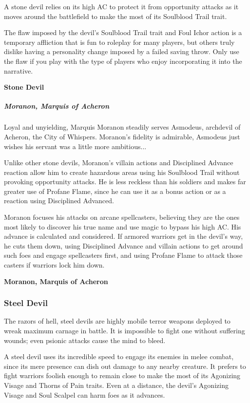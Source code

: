 \documentclass[10pt,a4paper,twoside,bg=print,twocolumn,openany,nodeprecatedcode]{dndbook}
\begin{document}
A stone devil relies on its high AC to protect it from opportunity attacks as it moves around the battlefield to make the most of its Soulblood Trail trait.

The flaw imposed by the devil's Soulblood Trail trait and Foul Ichor action is a temporary affliction that is fun to roleplay for many players, but others truly dislike having a personality change imposed by a failed saving throw. Only use the flaw if you play with the type of players who enjoy incorporating it into the narrative.

\textbf{Stone Devil}

\subparagraph{Moranon, Marquis of Acheron}
Loyal and unyielding, Marquis Moranon steadily serves Asmodeus, archdevil of Acheron, the City of Whispers. Moranon's fidelity is admirable, Asmodeus just wishes his servant was a little more ambitious...

Unlike other stone devils, Moranon's villain actions and Disciplined Advance reaction allow him to create hazardous areas using his Soulblood Trail without provoking opportunity attacks. He is less reckless than his soldiers and makes far greater use of Profane Flame, since he can use it as a bonus action or as a reaction using Disciplined Advanced.

Moranon focuses his attacks on arcane spellcasters, believing they are the ones most likely to discover his true name and use magic to bypass his high AC. His advance is calculated and considered. If armored warriors get in the devil's way, he cuts them down, using Disciplined Advance and villain actions to get around such foes and engage spellcasters first, and using Profane Flame to attack those casters if warriors lock him down.

\textbf{Moranon, Marquis of Acheron}

\subsubsection{Steel Devil}
The razors of hell, steel devils are highly mobile terror weapons deployed to wreak maximum carnage in battle. It is impossible to fight one without suffering wounds; even psionic attacks cause the mind to bleed.

A steel devil uses its incredible speed to engage its enemies in melee combat, since its mere presence can dish out damage to any nearby creature. It prefers to fight warriors foolish enough to remain close to make the most of its Agonizing Visage and Thorns of Pain traits. Even at a distance, the devil's Agonizing Visage and Soul Scalpel can harm foes as it advances.
\end{document}
